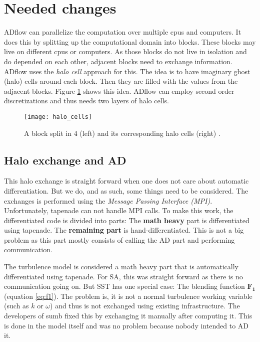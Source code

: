 \section{Needed changes}
ADflow can parallelize the computation over multiple cpus and computers. It
does this by splitting up the computational domain into blocks. These blocks
may live on different cpus or computers. As those blocks do not live in
isolation and do depended on each other, adjacent blocks need to exchange
information. ADflow uses the \textit{halo cell} approach for this. The idea is
to have imaginary ghost (halo) cells around each block. Then they are filled
with the values from the adjacent blocks. Figure \ref{fig:halo_cells} shows
this idea. ADflow can employ second order discretizations and thus needs two
layers of halo cells.

\begin{figure}[H] \centering
\texttt{[image: halo\_cells]}
    \caption{A block split in 4 (left) and its corresponding halo cells (right)
            \cite{cfd_halo}.}
    \label{fig:halo_cells}
\end{figure}




\subsection{Halo exchange and AD}
This halo exchange is straight forward when one does not care about automatic
differentiation. But we do, and as such, some things need to be considered. The
exchanges is performed using the \textit{Message Passing Interface (MPI)}.
Unfortunately, tapenade can not handle MPI calls. To make this work, the
differentiated code is divided into parts: The \textbf{math heavy} part is
differentiated using tapenade. The \textbf{remaining part} is
hand-differentiated. This is not a big problem as this part mostly consists of
calling the AD part and performing communication. 

The turbulence model is considered a math heavy part that is automatically
differentiated using tapenade. For SA, this was straight forward as there is no
communication going on. But SST has one special case: The blending function
$\mathbf{F_1}$ (equation \ref{eq:f1}). The problem is, it is not a normal
turbulence working variable (such as $k$ or $\omega$) and thus is not exchanged
using existing infrastructure. The developers of sumb fixed this by exchanging
it manually after computing it. This is done in the model itself and was no
problem because nobody intended to AD it. \\

